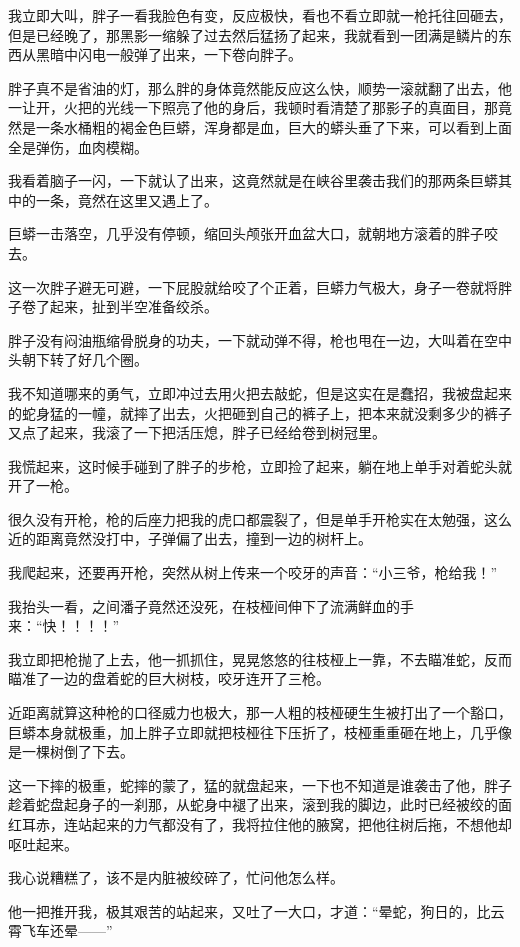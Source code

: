 我立即大叫，胖子一看我脸色有变，反应极快，看也不看立即就一枪托往回砸去，但是已经晚了，那黑影一缩躲了过去然后猛扬了起来，我就看到一团满是鳞片的东西从黑暗中闪电一般弹了出来，一下卷向胖子。

胖子真不是省油的灯，那么胖的身体竟然能反应这么快，顺势一滚就翻了出去，他一让开，火把的光线一下照亮了他的身后，我顿时看清楚了那影子的真面目，那竟然是一条水桶粗的褐金色巨蟒，浑身都是血，巨大的蟒头垂了下来，可以看到上面全是弹伤，血肉模糊。

我看着脑子一闪，一下就认了出来，这竟然就是在峡谷里袭击我们的那两条巨蟒其中的一条，竟然在这里又遇上了。

巨蟒一击落空，几乎没有停顿，缩回头颅张开血盆大口，就朝地方滚着的胖子咬去。

这一次胖子避无可避，一下屁股就给咬了个正着，巨蟒力气极大，身子一卷就将胖子卷了起来，扯到半空准备绞杀。

胖子没有闷油瓶缩骨脱身的功夫，一下就动弹不得，枪也甩在一边，大叫着在空中头朝下转了好几个圈。

我不知道哪来的勇气，立即冲过去用火把去敲蛇，但是这实在是蠢招，我被盘起来的蛇身猛的一幢，就摔了出去，火把砸到自己的裤子上，把本来就没剩多少的裤子又点了起来，我滚了一下把活压熄，胖子已经给卷到树冠里。

我慌起来，这时候手碰到了胖子的步枪，立即捡了起来，躺在地上单手对着蛇头就开了一枪。

很久没有开枪，枪的后座力把我的虎口都震裂了，但是单手开枪实在太勉强，这么近的距离竟然没打中，子弹偏了出去，撞到一边的树杆上。

我爬起来，还要再开枪，突然从树上传来一个咬牙的声音：“小三爷，枪给我！”

我抬头一看，之间潘子竟然还没死，在枝桠间伸下了流满鲜血的手来：“快！！！！”

我立即把枪抛了上去，他一抓抓住，晃晃悠悠的往枝桠上一靠，不去瞄准蛇，反而瞄准了一边的盘着蛇的巨大树枝，咬牙连开了三枪。

近距离就算这种枪的口径威力也极大，那一人粗的枝桠硬生生被打出了一个豁口，巨蟒本身就极重，加上胖子立即就把枝桠往下压折了，枝桠重重砸在地上，几乎像是一棵树倒了下去。

这一下摔的极重，蛇摔的蒙了，猛的就盘起来，一下也不知道是谁袭击了他，胖子趁着蛇盘起身子的一刹那，从蛇身中褪了出来，滚到我的脚边，此时已经被绞的面红耳赤，连站起来的力气都没有了，我将拉住他的腋窝，把他往树后拖，不想他却呕吐起来。

我心说糟糕了，该不是内脏被绞碎了，忙问他怎么样。

他一把推开我，极其艰苦的站起来，又吐了一大口，才道：“晕蛇，狗日的，比云霄飞车还晕——”

